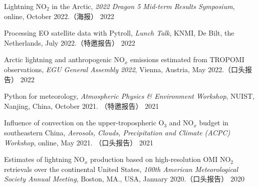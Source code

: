 

\begin{cvpublications}

\publication
{Lightning NO$_2$ in the Arctic,
\emph{2022 Dragon 5 Mid-term Results Symposium},
online, October 2022.（海报）} %
{2022} %

\publication
{Processing EO satellite data with Pytroll,
\emph{Lunch Talk},
KNMI, De Bilt, the Netherlands, July 2022.（特邀报告）} %
{2022} %

\publication
{Arctic lightning and anthropogenic NO$_x$ emissions estimated from TROPOMI observations,
\emph{EGU General Assembly 2022},
Vienna, Austria, May 2022.（口头报告）} %
{2022} %

\publication
{Python for meteorology,
\emph{Atmospheric Physics \& Environment Workshop},
NUIST, Nanjing, China, October 2021. （特邀报告）} %
{2021} %

\publication
{Influence of convection on the upper-tropospheric O$_3$ and NO$_x$ budget in southeastern China,
\emph{Aerosols, Clouds, Precipitation and Climate (ACPC) Workshop},
online, May 2021. （口头报告）} %
{2021} %


\publication
{Estimates of lightning NO$_x$ production based on high-resolution OMI NO$_2$ retrievals over the continental United States,
\emph{100th American Meteorological Society Annual Meeting},
Boston, MA., USA, January 2020.（口头报告）} %
{2020} %



\end{cvpublications}
